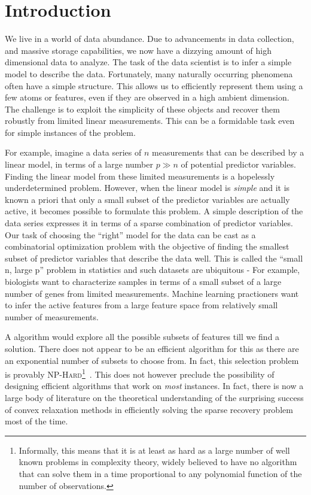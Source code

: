 \chapter{Introduction}

We live in a world of data abundance. Due to advancements in data collection,
and massive storage capabilities, we now have a dizzying amount of high
dimensional data to analyze. The task of the data scientist is to infer a simple
model to describe the data. Fortunately, many naturally occurring phenomena
often have a simple structure. This allows us to efficiently represent them
using a few atoms or features, even if they are observed in a high ambient
dimension. The challenge is to exploit the simplicity of these objects and
recover them robustly from limited linear measurements. This can be a formidable
task even for simple instances of the problem.

For example, imagine a data series of $n$ measurements that can be described by
a linear model, in terms of a large number $p \gg n$ of potential predictor
variables. Finding the linear model from these limited measurements is a
hopelessly underdetermined problem. However, when the linear model is
\emph{simple} and it is known a priori that only a small subset of the predictor
variables are actually active, it becomes possible to formulate this problem. A
simple description of the data series expresses it in terms of a sparse
combination of predictor variables. Our task of choosing the ``right'' model for
the data can be cast as a combinatorial optimization problem with the objective
of finding the smallest subset of predictor variables that describe the data
well. This is called the ``small n, large p'' problem in statistics and such
datasets are ubiquitous - For example, biologists want to characterize samples
in terms of a small subset of a large number of genes from limited measurements.
Machine learning practioners want to infer the active features from a large
feature space from relatively small number of measurements.

A \naive{} algorithm would explore all the possible subsets of features till we
find a solution. There does not appear to be an efficient algorithm for this as
there are an exponential number of subsets to choose from. In fact, this
selection problem is provably \textsc{NP-Hard}\footnote{Informally, this means
that it is at least as hard as a large number of well known problems in
complexity theory, widely believed to have no algorithm that can solve them in a
time proportional to any polynomial function of the number of
observations.}~\cite{Natarajan95}. This does not however preclude the
possibility of designing efficient algorithms that work on \emph{most}
instances. In fact, there is now a large body of literature on the theoretical
understanding of the surprising success of convex relaxation methods in
efficiently solving the sparse recovery problem most of the time.
\\

